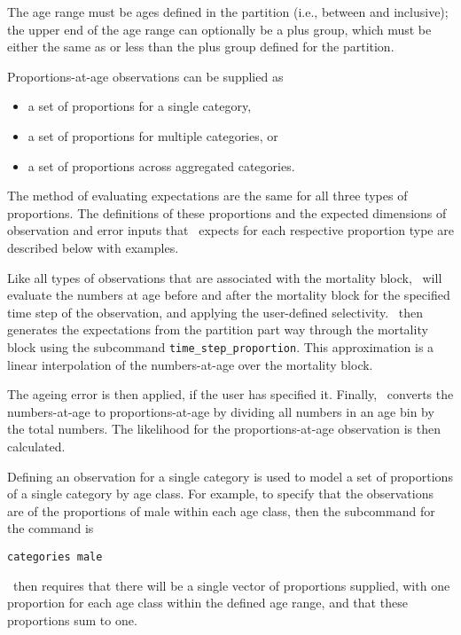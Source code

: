 The age range must be ages defined in the partition (i.e., between  and  inclusive); the upper end of the age range can optionally be a plus group, which must be either the same as or less than the plus group defined for the partition.

Proportions-at-age observations can be supplied as

\begin{itemize}
	\item a set of proportions for a single category,
	\item a set of proportions for multiple categories, or
	\item a set of proportions across aggregated categories.
\end{itemize}

The method of evaluating expectations are the same for all three types of proportions. The definitions of these proportions and the expected dimensions of observation and error inputs that \CNAME\ expects for each respective proportion type are described below with examples.

Like all types of observations that are associated with the mortality block, \CNAME\ will evaluate the numbers at age before and after the mortality block for the specified time step of the observation, and applying the user-defined selectivity. \CNAME\ then generates the expectations from the partition part way through the mortality block using the subcommand \texttt{time\_step\_proportion}. This approximation is a linear interpolation of the numbers-at-age over the mortality block.

The ageing error is then applied, if the user has specified it. Finally, \CNAME\ converts the numbers-at-age to proportions-at-age by dividing all numbers in an age bin by the total numbers. The likelihood for the proportions-at-age observation is then calculated.

Defining an observation for a single category is used to model a set of proportions of a single category by age class. For example, to specify that the observations are of the proportions of male within each age class, then the subcommand  for the  command is

{\small{\begin{verbatim}
categories male
\end{verbatim}}}

\CNAME\ then requires that there will be a single vector of proportions supplied, with one proportion for each age class within the defined age range, and that these proportions sum to one.

